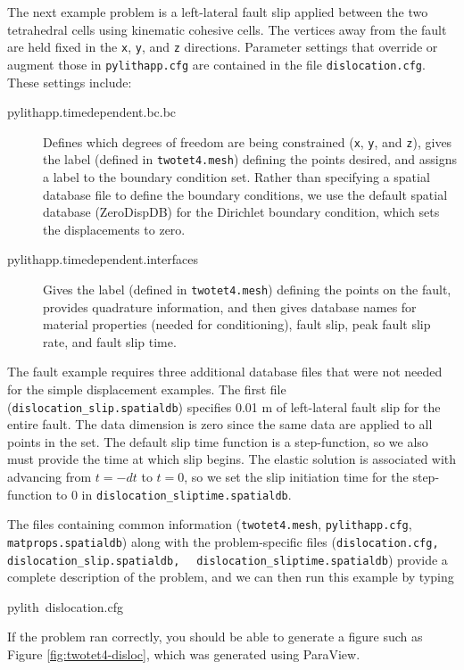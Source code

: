 The next example problem is a left-lateral fault slip applied between
the two tetrahedral cells using kinematic cohesive cells. The vertices
away from the fault are held fixed in the \texttt{x}, \texttt{y},
and \texttt{z} directions. Parameter settings that override or augment
those in \texttt{pylithapp.cfg} are contained in the file \texttt{dislocation.cfg}.
These settings include:
\begin{description}
\item [{pylithapp.timedependent.bc.bc}] Defines which degrees of freedom
are being constrained (\texttt{x}, \texttt{y}, and \texttt{z}), gives
the label (defined in \texttt{twotet4.mesh}) defining the points desired,
and assigns a label to the boundary condition set. Rather than specifying
a spatial database file to define the boundary conditions, we use
the default spatial database (ZeroDispDB) for the Dirichlet boundary
condition, which sets the displacements to zero.
\item [{pylithapp.timedependent.interfaces}] Gives the label (defined in
\texttt{twotet4.mesh}) defining the points on the fault, provides
quadrature information, and then gives database names for material
properties (needed for conditioning), fault slip, peak fault slip
rate, and fault slip time.
\end{description}
The fault example requires three additional database files that were
not needed for the simple displacement examples. The first file (\texttt{dislocation\_slip.spatialdb})
specifies 0.01 m of left-lateral fault slip for the entire fault.
The data dimension is zero since the same data are applied to all
points in the set. The default slip time function is a step-function,
so we also must provide the time at which slip begins. The elastic
solution is associated with advancing from $t=-dt$ to $t=0$, so
we set the slip initiation time for the step-function to 0 in \texttt{dislocation\_sliptime.spatialdb}.

The files containing common information (\texttt{twotet4.mesh}, \texttt{pylithapp.cfg},
\texttt{matprops.spatialdb}) along with the problem-specific files
(\texttt{dislocation.cfg, dislocation\_slip.spatialdb, }~\linebreak{}
\texttt{dislocation\_sliptime.spatialdb}) provide a complete description
of the problem, and we can then run this example by typing
\begin{lyxcode}
pylith~dislocation.cfg
\end{lyxcode}
If the problem ran correctly, you should be able to generate a figure
such as Figure \vref{fig:twotet4-disloc}, which was generated using
ParaView.

